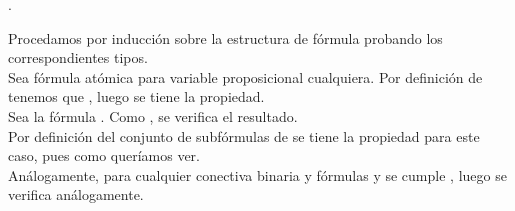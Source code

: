 \begin{isabellebody}
\begin{isamarkuptext}
  \begin{lema}
    .
  \end{lema}

  \begin{demostracion}
    Procedamos por inducción sobre la estructura de fórmula probando los correspondientes tipos.\\
    Sea  fórmula atómica para  variable proposicional cualquiera. Por definición
    de  tenemos que , luego se tiene la propiedad.\\
    Sea la fórmula \isa{{\isasymbottom}}. Como , se verifica el resultado.\\
    Por definición del conjunto de subfórmulas de  se tiene la propiedad 
    para este caso, pues  como queríamos ver.\\
    Análogamente, para cualquier conectiva binaria \isa{{\isacharasterisk}} y fórmulas  y  se cumple
    , luego se verifica análogamente.
  \end{demostracion}


\end{isamarkuptext}
\end{isabellebody}
